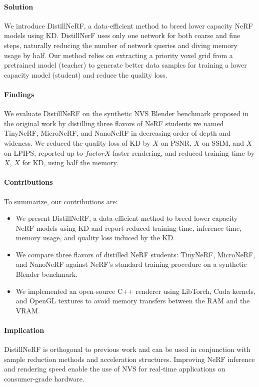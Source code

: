 \paragraph{Solution}
We introduce DistillNeRF, a data-efficient method to breed lower capacity \gls{NeRF} models using \gls{KD}. DistillNerF uses only one network for both coarse and fine steps, naturally reducing the number of network queries and diving memory usage by half. Our method relies on extracting a priority voxel grid from a pretrained model (teacher) to generate better data samples for training a lower capacity model (student) and reduce the quality loss.

\paragraph{Findings}
We evaluate DistillNeRF on the synthetic \gls{NVS} Blender benchmark proposed in the original work by distilling three flavors of \gls{NeRF} students we named TinyNeRF, MicroNeRF, and NanoNeRF in decreasing order of depth and wideness. We reduced the quality loss of \gls{KD} by $X$ on PSNR, $X$ on SSIM, and $X$ on LPIPS, reported up to $factorX$ faster rendering, and reduced training time by $X$, $X$ for \gls{KD}, using half the memory.

\paragraph{Contributions}
To summarize, our contributions are:
\begin{itemize}
    \item We present DistillNeRF, a data-efficient method to breed lower capacity \gls{NeRF} models using \gls{KD} and report reduced training time, inference time, memory usage, and quality loss induced by the \gls{KD}.
    \item We compare three flavors of distilled NeRF students: TinyNeRF, MicroNeRF, and NanoNeRF against NeRF's standard training procedure on a synthetic Blender benchmark.
    \item We implemented an open-source C++ renderer using LibTorch, Cuda kernels, and OpenGL textures to avoid memory transfers between the RAM and the VRAM.
\end{itemize}

\paragraph{Implication}
DistillNeRF is orthogonal to previous work and can be used in conjunction with sample reduction methods and acceleration structures. Improving \gls{NeRF} inference and rendering speed enable the use of \gls{NVS} for real-time applications on consumer-grade hardware.

